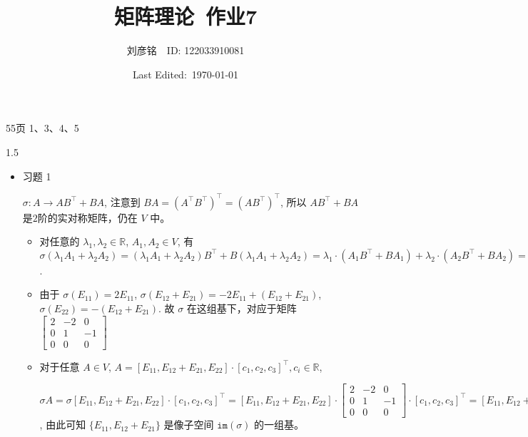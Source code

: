 \documentclass{article}
\title{矩阵理论\ 作业7}
\author{刘彦铭\ \ ID: 122033910081}
\date{Last Edited:\ \today}
\begin{document}
\maketitle

55页 1、3、4、5

\begin{spacing}{1.5}
    
\begin{itemize}
    \item [1.] 习题 1
    
        $\sigma: A \to AB^\top + BA$, 注意到 $BA = (A^\top B^\top)^\top = (AB^\top)^\top$, 所以  $AB^\top + BA$ 是$2$阶的实对称矩阵，仍在 $V$ 中。 

        \begin{itemize}
            \item [(1)] 对任意的 $\lambda_1, \lambda_2 \in\mathbb{R}$, $A_1, A_2\in V$, 有 $\sigma(\lambda_1 A_1 + \lambda_2 A_2) = (\lambda_1 A_1 + \lambda_2 A_2) B^\top + B(\lambda_1 A_1 + \lambda_2 A_2)= \lambda_1\cdot(A_1B^\top + BA_1) + \lambda_2\cdot (A_2B^\top + BA_2) = \lambda_1 \sigma(A_1) + \lambda_2 \sigma(A_2)$.
            \item [(2)] 由于 $\sigma(E_{11}) = 2E_{11}$, $\sigma(E_{12} + E_{21}) = -2 E_{11} + (E_{12} + E_{21})$, $\sigma(E_{22}) = - (E_{12} + E_{21})$. 故 $\sigma$ 在这组基下，对应于矩阵 $\left[\begin{array}{ccc}2&-2&0\\0&1&-1\\0&0&0\end{array}\right]$
            \item [(3)] 对于任意 $A\in V$, $A = [E_{11}, E_{12} + E_{21}, E_{22}]\cdot [c_1, c_2, c_3]^\top, c_i\in\mathbb{R}$,
            
            $\sigma A = \sigma[E_{11}, E_{12} + E_{21}, E_{22}] \cdot [c_1, c_2, c_3]^\top = [E_{11}, E_{12} + E_{21}, E_{22}] \cdot \left[\begin{array}{ccc}2&-2&0\\0&1&-1\\0&0&0\end{array}\right]\cdot [c_1, c_2, c_3]^\top = [E_{11}, E_{12} + E_{21}, E_{22}]\cdot \left[2c_1 - 2c_2, c_2 - c_3, 0\right]^\top$, 由此可知 $\{E_{11}, E_{12} + E_{21}\}$ 是像子空间 $\mathtt{im}(\sigma)$ 的一组基。
            

\end{itemize}
\end{itemize}
\end{spacing}
\end{document}
